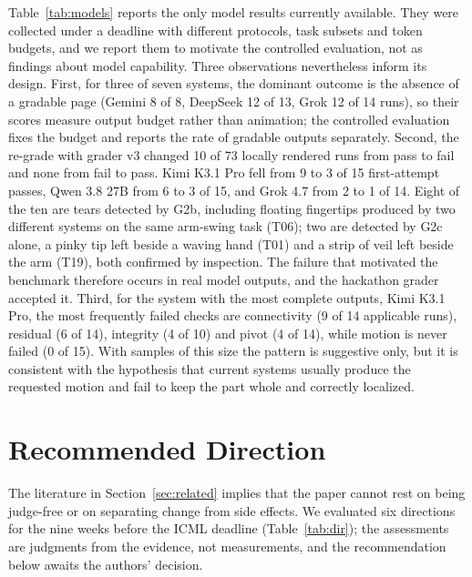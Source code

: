 \documentclass[11pt]{article}
\newcommand{\chk}[1]{\textsf{#1}}
\begin{document}
Table~\ref{tab:models} reports the only model results currently available. They were collected under a deadline with different protocols, task subsets and token budgets, and we report them to motivate the controlled evaluation, not as findings about model capability. Three observations nevertheless inform its design. First, for three of seven systems, the dominant outcome is the absence of a gradable page (Gemini 8 of 8, DeepSeek 12 of 13, Grok 12 of 14 runs), so their scores measure output budget rather than animation; the controlled evaluation fixes the budget and reports the rate of gradable outputs separately. Second, the re-grade with grader v3 changed 10 of 73 locally rendered runs from pass to fail and none from fail to pass. Kimi K3.1 Pro fell from 9 to 3 of 15 first-attempt passes, Qwen 3.8 27B from 6 to 3 of 15, and Grok 4.7 from 2 to 1 of 14. Eight of the ten are tears detected by \chk{G2b}, including floating fingertips produced by two different systems on the same arm-swing task (T06); two are detected by \chk{G2c} alone, a pinky tip left beside a waving hand (T01) and a strip of veil left beside the arm (T19), both confirmed by inspection. The failure that motivated the benchmark therefore occurs in real model outputs, and the hackathon grader accepted it. Third, for the system with the most complete outputs, Kimi K3.1 Pro, the most frequently failed checks are connectivity (9 of 14 applicable runs), residual (6 of 14), integrity (4 of 10) and pivot (4 of 14), while motion is never failed (0 of 15). With samples of this size the pattern is suggestive only, but it is consistent with the hypothesis that current systems usually produce the requested motion and fail to keep the part whole and correctly localized.


\section{Recommended Direction}
\label{sec:direction}

The literature in Section~\ref{sec:related} implies that the paper cannot rest on being judge-free or on separating change from side effects. We evaluated six directions for the nine weeks before the ICML deadline (Table~\ref{tab:dir}); the assessments are judgments from the evidence, not measurements, and the recommendation below awaits the authors' decision.
\end{document}
